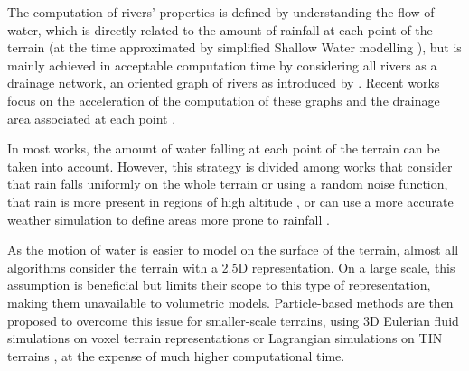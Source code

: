 The computation of rivers' properties is defined by understanding the flow of water, which is directly related to the amount of rainfall at each point of the terrain \cite{Kelley1988} (at the time approximated by simplified Shallow Water modelling \cite{Mei2007}), but is mainly achieved in acceptable computation time by considering all rivers as a drainage network, an oriented graph of rivers as introduced by \cite{Roudier1993}. Recent works focus on the acceleration of the computation of these graphs and the drainage area associated at each point \cite{Cordonnier2016,Schott2023}.

In most works, the amount of water falling at each point of the terrain can be taken into account. However, this strategy is divided among works that consider that rain falls uniformly on the whole terrain or using a random noise function, that rain is more present in regions of high altitude \cite{Neidhold2005}, or can use a more accurate weather simulation to define areas more prone to rainfall \cite{Wojtek2022}.

As the motion of water is easier to model on the surface of the terrain, almost all algorithms consider the terrain with a 2.5D representation. On a large scale, this assumption is beneficial but limits their scope to this type of representation, making them unavailable to volumetric models. Particle-based methods are then proposed to overcome this issue for smaller-scale terrains, using 3D Eulerian fluid simulations on voxel terrain representations \cite{Benes2006} or Lagrangian simulations on TIN terrains \cite{Kristof2009}, at the expense of much higher computational time.


